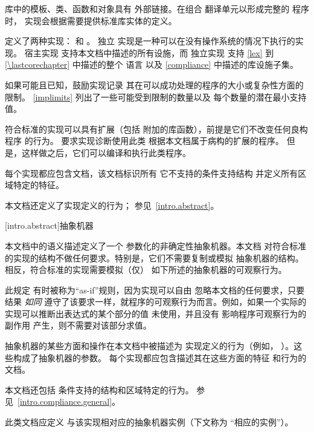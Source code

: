 \pnum
库中的模板、类、函数和对象具有
外部链接。在组合
翻译单元以形成完整的 \Cpp{} 程序 时，
实现会根据需要提供标准库实体的定义。%

\pnum
定义了两种实现： 和
。
独立
实现是一种可以在没有操作系统的情况下执行的实现。
宿主实现
支持本文档中描述的所有设施，而
独立实现
支持 \ref{lex} 到 \ref{\lastcorechapter} 中描述的整个 \Cpp{} 语言
以及 \ref{compliance} 中描述的库设施子集。

\pnum
如果可能且已知，鼓励实现记录
其在可以成功处理的程序的大小或复杂性方面的限制。
\ref{implimits} 列出了一些可能受到限制的数量以及
每个数量的潜在最小支持值。

\pnum
符合标准的实现可以具有扩展（包括
附加的库函数），前提是它们不改变任何良构程序
的行为。
要求实现诊断使用此类
根据本文档属于病构的扩展的程序。
但是，这样做之后，它们可以编译和执行此类程序。

\pnum
每个实现都应包含文档，该文档标识所有
它不支持的条件支持结构
并定义所有区域特定的特征。
\begin{footnote}
本文档还定义了实现定义的行为；
参见~\ref{intro.abstract}。
\end{footnote}
%
%

[intro.abstract]{抽象机器}

\pnum
{}%
%
本文档中的语义描述定义了一个
参数化的非确定性抽象机器。本文档
对符合标准的实现的结构不做任何要求。特别是，它们不需要复制或模拟
抽象机器的结构。
%
%
相反，符合标准的实现需要模拟（仅）
如下所述的抽象机器的可观察行为。
\begin{footnote}
此规定
有时被称为“as-if”规则，因为实现可以自由
忽略本文档的任何要求，只要结果
\emph{如同} 遵守了该要求一样，就程序的可观察行为而言。例如，如果一个实际的
实现可以推断出表达式的某个部分的值
未使用，并且没有
%
影响程序可观察行为的副作用
产生，则不需要对该部分求值。
\end{footnote}

\pnum
{}%
抽象机器的某些方面和操作在本文档中被描述为
实现定义的行为（例如，
）。这些构成了抽象机器的参数。
每个实现都应包含描述其在这些方面的特征
和行为的文档。
\begin{footnote}
本文档还包括
条件支持的结构和区域特定的行为。
参见~\ref{intro.compliance.general}。
\end{footnote}
此类文档应定义
与该实现相对应的抽象机器实例（下文称为
“相应的实例”）。

